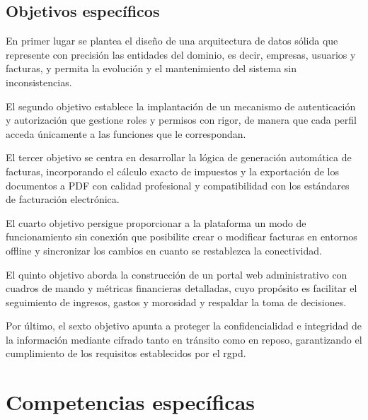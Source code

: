 \subsection{Objetivos específicos}

\begin{large}

En primer lugar se plantea el diseño de una arquitectura de datos sólida que represente con precisión las entidades del dominio, es decir, empresas, usuarios y facturas, y permita la evolución y el mantenimiento del sistema sin inconsistencias.

El segundo objetivo establece la implantación de un mecanismo de autenticación y autorización que gestione roles y permisos con rigor, de manera que cada perfil acceda únicamente a las funciones que le correspondan.

El tercer objetivo se centra en desarrollar la lógica de generación automática de facturas, incorporando el cálculo exacto de impuestos y la exportación de los documentos a PDF con calidad profesional y compatibilidad con los estándares de facturación electrónica.

El cuarto objetivo persigue proporcionar a la plataforma un modo de funcionamiento sin conexión que posibilite crear o modificar facturas en entornos offline y sincronizar los cambios en cuanto se restablezca la conectividad.

El quinto objetivo aborda la construcción de un portal web administrativo con cuadros de mando y métricas financieras detalladas, cuyo propósito es facilitar el seguimiento de ingresos, gastos y morosidad y respaldar la toma de decisiones.

Por último, el sexto objetivo apunta a proteger la confidencialidad e integridad de la información mediante cifrado tanto en tránsito como en reposo, garantizando el cumplimiento de los requisitos establecidos por el \gls{rgpd}.

\end{large}

\section{Competencias específicas}


